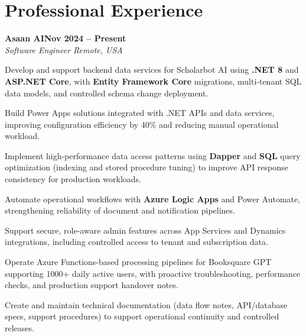 \documentclass[letterpaper,10pt]{article}
\newcommand{\headingBf}[2]{
  \hspace{10pt}\textbf{#1}\hfill\textbf{#2}\\
}
\newcommand{\headingIt}[2]{
  \hspace{10pt}\textit{#1}\hfill\textit{#2}\\
}
\newenvironment{resume_list}{
  \vspace{-7pt}
  \begin{itemize}[itemsep=-2px, parsep=1pt, leftmargin=30pt]
}{
  \end{itemize}
}
\begin{document}
\section{Professional Experience}

\headingBf{Asaan AI}{Nov 2024 -- Present}
\headingIt{Software Engineer \hfill Remote, USA}{}
\begin{resume_list}
    \item Develop and support backend data services for Scholarbot AI using \textbf{.NET 8} and \textbf{ASP.NET Core}, with \textbf{Entity Framework Core} migrations, multi-tenant SQL data models, and controlled schema change deployment.
    \item Build Power Apps solutions integrated with .NET APIs and data services, improving configuration efficiency by 40\% and reducing manual operational workload.
    \item Implement high-performance data access patterns using \textbf{Dapper} and \textbf{SQL} query optimization (indexing and stored procedure tuning) to improve API response consistency for production workloads.
    \item Automate operational workflows with \textbf{Azure Logic Apps} and Power Automate, strengthening reliability of document and notification pipelines.
    \item Support secure, role-aware admin features across App Services and Dynamics integrations, including controlled access to tenant and subscription data.
    \item Operate Azure Functions-based processing pipelines for Booksquare GPT supporting 1000+ daily active users, with proactive troubleshooting, performance checks, and production support handover notes.
    \item Create and maintain technical documentation (data flow notes, API/database specs, support procedures) to support operational continuity and controlled releases.
\end{resume_list}
\end{document}
